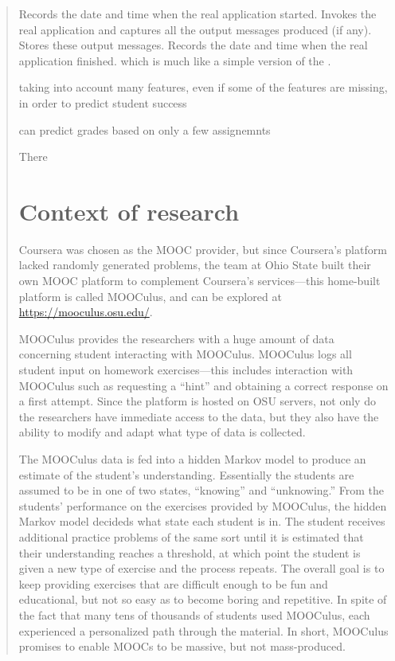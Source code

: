 \documentclass[12pt]{article}
\begin{document}
\begin{quote}
Records the date and time when the real application started.
Invokes the real application and captures all the output messages produced (if any).
Stores these output messages.
Records the date and time when the real application finished.
\parencite{RomeroZaldivar20121058} 
which is much like a simple version of the \parencite{tin-can-api}.


taking into account many features, even if some of the features are
missing, in order to predict student
success \parencite{Zafra201115020}

can predict grades based on only a few assignemnts \parencite{predict-grades}


There 



\section{Context of research}

Coursera was chosen as the MOOC provider, but since Coursera's
platform lacked randomly generated problems, the team at Ohio State
built their own MOOC platform to complement Coursera's services---this
home-built platform is called MOOCulus, and can be explored at
\url{https://mooculus.osu.edu/}.

MOOCulus provides the researchers with a huge amount of data
concerning student interacting with MOOCulus. MOOCulus logs all
student input on homework exercises---this includes interaction with
MOOCulus such as requesting a ``hint'' and obtaining a correct
response on a first attempt.  Since the platform is hosted on OSU
servers, not only do the researchers have immediate access to the
data, but they also have the ability to modify and adapt what type of
data is collected. 


The MOOCulus data is fed into a hidden Markov model to produce an
estimate of the student's understanding. Essentially the students are
assumed to be in one of two states, ``knowing'' and ``unknowing.''
From the students' performance on the exercises provided by MOOCulus,
the hidden Markov model decideds what state each student is in. The
student receives additional practice problems of the same sort until
it is estimated that their understanding reaches a threshold, at which
point the student is given a new type of exercise and the process
repeats.  The overall goal is to keep providing exercises that are
difficult enough to be fun and educational, but not so easy as to
become boring and repetitive.  In spite of the fact that many tens of
thousands of students used MOOCulus, each experienced a personalized
path through the material.  In short, MOOCulus promises to enable
MOOCs to be massive, but not mass-produced.


\end{quote}
\end{document}
